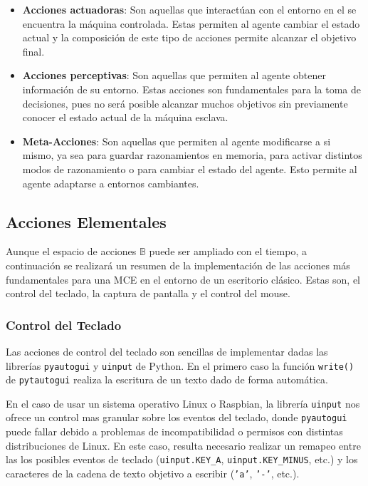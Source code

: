 \begin{itemize}

    \item \textbf{Acciones actuadoras}: Son aquellas que interactúan con el entorno en el
    se encuentra la máquina controlada. Estas permiten al agente cambiar el estado actual
    y la composición de este tipo de acciones permite alcanzar el objetivo final.

    \item \textbf{Acciones perceptivas}: Son aquellas que permiten al agente obtener 
    información de su entorno. Estas acciones son fundamentales para la toma de decisiones,
    pues no será posible alcanzar muchos objetivos sin previamente conocer el estado actual
    de la máquina esclava.

    \item \textbf{Meta-Acciones}: Son aquellas que permiten al agente modificarse a si mismo,
    ya sea para guardar razonamientos en memoria, para activar distintos modos de razonamiento
    o para cambiar el estado del agente. Esto permite al agente adaptarse a entornos cambiantes.

\end{itemize}

\subsection{Acciones Elementales}

Aunque el espacio de acciones \(\mathbb{B}\) puede ser ampliado con
el tiempo, a continuación se realizará un resumen de la implementación de las acciones más fundamentales para una
MCE en el entorno de un escritorio clásico. Estas son, el control del teclado,
la captura de pantalla y el control del mouse.

\subsubsection{Control del Teclado}

Las acciones de control del teclado son sencillas de implementar dadas las librerías
\texttt{pyautogui} y \texttt{uinput} de Python. En el primero caso la función 
\texttt{write()} de \texttt{pytautogui} realiza la escritura de un texto dado de forma automática.

En el caso de usar un sistema operativo Linux o Raspbian, la librería \texttt{uinput} nos
ofrece un control mas granular sobre los eventos del teclado, donde \texttt{pyautogui} puede fallar
debido a problemas de incompatibilidad o permisos con distintas distribuciones de Linux. 
En este caso, resulta necesario realizar un remapeo entre las los posibles eventos de teclado
(\texttt{uinput.KEY\_A}, \texttt{uinput.KEY\_MINUS}, etc.) y los caracteres de la cadena de 
texto objetivo a escribir (\texttt{'a'}, \texttt{'-'}, etc.).

